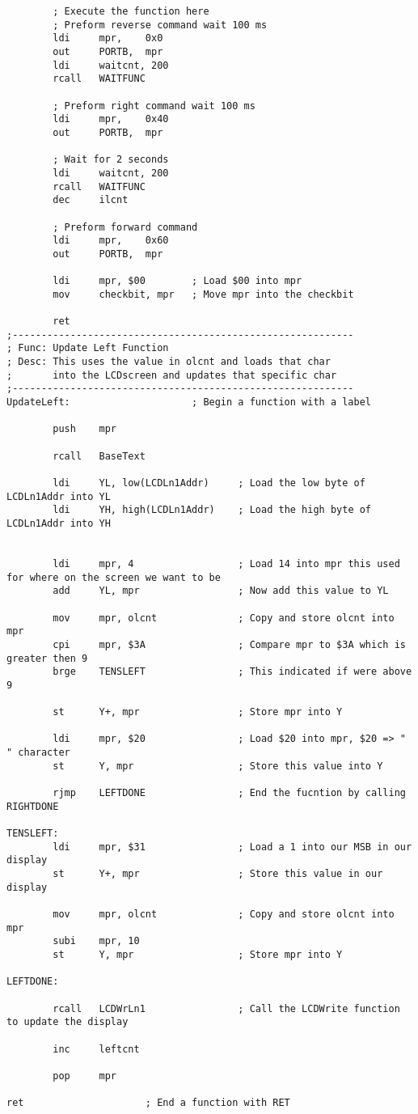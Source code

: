 \documentclass[12pt, letterpaper]{article}
\begin{document}
\begin{verbatim}
		; Execute the function here
		; Preform reverse command wait 100 ms
		ldi		mpr,	0x0
		out		PORTB,	mpr
		ldi		waitcnt, 200
		rcall	WAITFUNC

		; Preform right command wait 100 ms
		ldi		mpr,	0x40
		out		PORTB,	mpr

		; Wait for 2 seconds
		ldi		waitcnt, 200
		rcall	WAITFUNC
		dec		ilcnt

		; Preform forward command
		ldi		mpr,	0x60
		out		PORTB,	mpr

		ldi		mpr, $00		; Load $00 into mpr
		mov		checkbit, mpr	; Move mpr into the checkbit

		ret
;-----------------------------------------------------------
; Func: Update Left Function
; Desc: This uses the value in olcnt and loads that char
;		into the LCDscreen and updates that specific char
;-----------------------------------------------------------
UpdateLeft:						; Begin a function with a label

		push	mpr

		rcall	BaseText

		ldi		YL, low(LCDLn1Addr)		; Load the low byte of LCDLn1Addr into YL
		ldi		YH, high(LCDLn1Addr)	; Load the high byte of LCDLn1Addr into YH


		ldi		mpr, 4					; Load 14 into mpr this used for where on the screen we want to be
		add		YL, mpr					; Now add this value to YL

		mov		mpr, olcnt				; Copy and store olcnt into mpr
		cpi		mpr, $3A				; Compare mpr to $3A which is greater then 9			
		brge	TENSLEFT				; This indicated if were above 9 

		st		Y+, mpr					; Store mpr into Y
		
		ldi		mpr, $20				; Load $20 into mpr, $20 => " " character
		st		Y, mpr					; Store this value into Y

		rjmp	LEFTDONE				; End the fucntion by calling RIGHTDONE

TENSLEFT:
		ldi		mpr, $31				; Load a 1 into our MSB in our display
		st		Y+, mpr					; Store this value in our display

		mov		mpr, olcnt				; Copy and store olcnt into mpr
		subi	mpr, 10
		st		Y, mpr					; Store mpr into Y

LEFTDONE:

		rcall	LCDWrLn1				; Call the LCDWrite function to update the display

		inc		leftcnt

		pop		mpr

ret						; End a function with RET


\end{verbatim}
\end{document}
